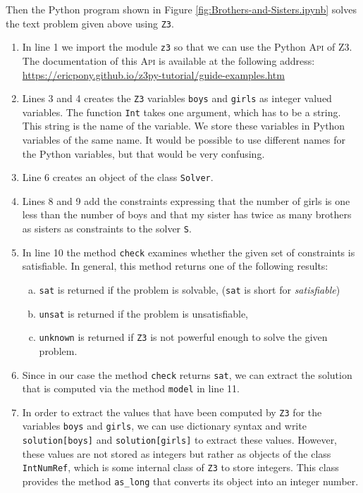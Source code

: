 \noindent
Then the Python program shown in Figure \ref{fig:Brothers-and-Sisters.ipynb} solves the text problem
given above using \texttt{Z3}.\begin{enumerate}
\item In line 1 we import the module \texttt{z3} so that we can use the Python \textsc{Api} of Z3.
      The documentation of this \textsc{Api} is available at the following address:
      \\[0.2cm]
      \hspace*{1.3cm}
      \href{https://ericpony.github.io/z3py-tutorial/guide-examples.htm}{https://ericpony.github.io/z3py-tutorial/guide-examples.htm}
\item Lines 3 and 4 creates the \texttt{Z3} variables \texttt{boys} and \texttt{girls} as integer valued variables.
      The function \texttt{Int} takes one argument, which has to be a string.  This string is the name of the
      variable.  We store these variables in Python variables of the same name.  It would be possible to use
      different names for the Python variables, but that would be very confusing.
\item Line 6 creates an object of the class \texttt{Solver}.
\item Lines 8 and 9 add the constraints expressing that the number of girls is one less than the number of boys
      and that my sister has twice as many brothers as sisters as constraints to the solver \texttt{S}. 
\item In line 10 the method \texttt{check} examines whether the given set of constraints is satisfiable.
      In general, this method returns one of the following results:
      \begin{enumerate}[(a)]
      \item \texttt{sat} is returned if the problem is solvable, (\texttt{sat} is short for \emph{satisfiable})
      \item \texttt{unsat} is returned if the problem is unsatisfiable,
      \item \texttt{unknown} is returned if \texttt{Z3} is not powerful enough to solve the given problem.
      \end{enumerate}
\item Since in our case the method \texttt{check} returns \texttt{sat}, we can extract the solution that is
      computed via the method \texttt{model} in line 11.  
\item In order to extract the values that have been computed by \texttt{Z3} for the variables \texttt{boys} and
      \texttt{girls}, we can use dictionary syntax and write \texttt{solution[boys]} and
      \texttt{solution[girls]} to extract these values.  However, these values are not stored as integers but
      rather as objects of the class \texttt{IntNumRef}, which is some internal class of \texttt{Z3} to store
      integers.  This class provides the method \texttt{as\_long} that converts its object into an integer number.
\end{enumerate}

